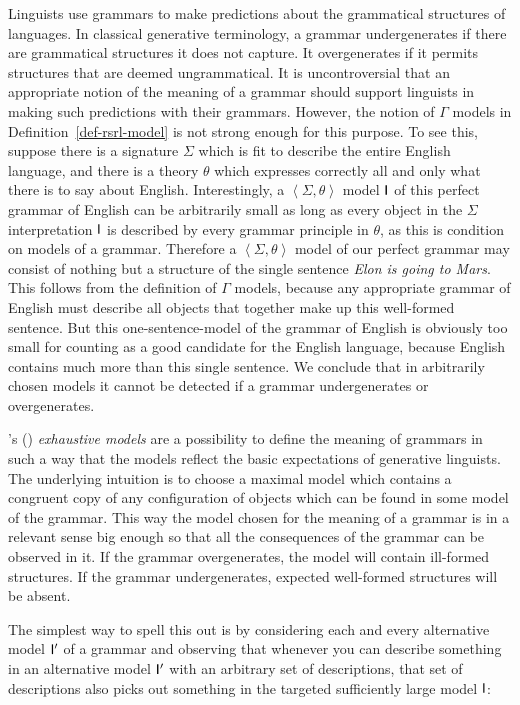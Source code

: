 \documentclass[output=paper
                ,modfonts
                ,nonflat
	        ,collection
	        ,collectionchapter
	        ,collectiontoclongg
 	        ,biblatex
                ,babelshorthands
                ,newtxmath
                ,draftmode
                ,colorlinks, citecolor=brown
]{./langsci/langscibook}
\begin{document}
{{Linguists use grammars to make predictions about the grammatical
structures of languages. In classical generative terminology, a
grammar undergenerates if there are grammatical structures it does not
capture. It overgenerates if it permits structures that are deemed
ungrammatical. It is uncontroversial that an appropriate notion of the
meaning of a grammar should support linguists in making such
predictions with their grammars. However, the notion of $\Gamma$
models in Definition~\ref{def-rsrl-model} is not strong enough for
this purpose. To see this, suppose there is a signature $\Sigma$ which
is fit to describe the entire English language, and there is a theory
$\theta$ which expresses correctly all and only what there is to say
about English.  Interestingly, a $\left< \Sigma, \theta \right>$ model
$\mathsf{I}$ of this perfect grammar of English can be arbitrarily small as
long as every object in the $\Sigma$ interpretation $\mathsf{I}$ is
described by every grammar principle in $\theta$, as this is condition
on models of a grammar. Therefore a $\left< \Sigma, \theta \right>$
model of our perfect grammar may consist of nothing but a structure of
the single sentence \emph{Elon is going to Mars}. This follows from
the definition of $\Gamma$ models, because any appropriate grammar of
English must describe all objects that together make up this
well-formed sentence.  But this one-sentence-model of the grammar of
English is obviously too small for counting as a good candidate for
the English language, because English contains much more than this
single sentence. We conclude that in arbitrarily chosen models it
cannot be detected if a grammar undergenerates or overgenerates.


\citeauthor{King99a-u}'s (\citeyear{King99a-u}) \emph{exhaustive models} are a possibility to
define the meaning of grammars in such a way that the models reflect the
basic expectations of generative linguists. The underlying intuition
is to choose a maximal model which contains a congruent copy of any
configuration of objects which can be found in some model of the grammar.
This way the model chosen for the meaning of a grammar is in a
relevant sense big enough so that all
the consequences of the grammar can be observed in it. If the grammar
overgenerates, the model will contain ill-formed structures. If the grammar
undergenerates, expected well-formed structures will be absent.

The simplest way to spell this out is by considering each and every
alternative model $\mathsf{I}'$ of a grammar and observing that whenever
you can describe something in an alternative model $\mathsf{I}'$ with an
arbitrary set of descriptions, that set of descriptions also picks out
something in the targeted sufficiently large model $\mathsf{I}$:

}}
\end{document}

